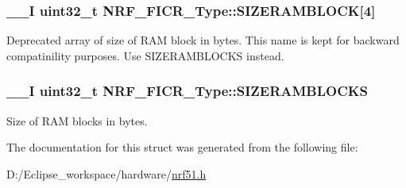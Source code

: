 \subsubsection[{S\+I\+Z\+E\+R\+A\+M\+B\+L\+O\+C\+K}]{\setlength{\rightskip}{0pt plus 5cm}\+\_\+\+\_\+\+I uint32\+\_\+t N\+R\+F\+\_\+\+F\+I\+C\+R\+\_\+\+Type\+::\+S\+I\+Z\+E\+R\+A\+M\+B\+L\+O\+C\+K\mbox{[}4\mbox{]}}\label{struct_n_r_f___f_i_c_r___type_a2fd553406ef3f6eead6bbe7def28e9f8}
Deprecated array of size of R\+A\+M block in bytes. This name is kept for backward compatinility purposes. Use S\+I\+Z\+E\+R\+A\+M\+B\+L\+O\+C\+K\+S instead. \hypertarget{struct_n_r_f___f_i_c_r___type_afb7c1966fe1dbedd16304a3b23ba6f7e}{}
\subsubsection[{S\+I\+Z\+E\+R\+A\+M\+B\+L\+O\+C\+K\+S}]{\setlength{\rightskip}{0pt plus 5cm}\+\_\+\+\_\+\+I uint32\+\_\+t N\+R\+F\+\_\+\+F\+I\+C\+R\+\_\+\+Type\+::\+S\+I\+Z\+E\+R\+A\+M\+B\+L\+O\+C\+K\+S}\label{struct_n_r_f___f_i_c_r___type_afb7c1966fe1dbedd16304a3b23ba6f7e}
Size of R\+A\+M blocks in bytes. 

The documentation for this struct was generated from the following file\+:\begin{DoxyCompactItemize}
\item 
D\+:/\+Eclipse\+\_\+workspace/hardware/\hyperlink{nrf51_8h}{nrf51.\+h}\end{DoxyCompactItemize}

